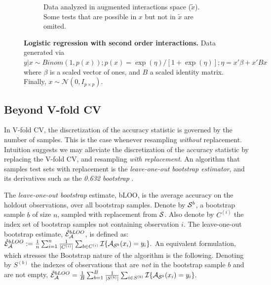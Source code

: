 \documentclass[oupdraft]{bio}
\begin{document}
\begin{figure}[th]
\begin{subfigure}[t]{.45\columnwidth}
		\caption{Data analyzed in augmented interactions space ($\tilde x$).
		Some tests that are possible in $x$ but not in $\tilde{x}$ are omited.}
		\label{fig:interactions-in-augmented-space}
	\end{subfigure}
	\caption{\textbf{Logistic regression with second order interactions.} 
		Data generated via $y|x \sim Binom(1,p(x));
		p(x)=\exp(\eta)/[1+\exp(\eta)];
		\eta=x'\beta+x'Bx$ where 
		$\beta$ is a scaled vector of ones, and $B$ a scaled identity matrix.
		Finally, $x\sim \mathcal{N}(0,I_{p\times p})$.
	 } 
	\label{fig:logistic-main-and-interactions}
\end{figure}





\subsection{Beyond V-fold CV}
\label{sec:bootstrap}

In V-fold CV, the discretization of the accuracy statistic is governed by the number of samples. 
This is the case whenever resampling \emph{without} replacement. 
Intuition suggests we may alleviate the discretization of the accuracy statistic by replacing the V-fold CV, and resampling \emph{with replacement}.
An algorithm that samples test sets with replacement is the \emph{leave-one-out bootstrap estimator},  and its derivatives such as the \emph{0.632 bootstrap} \citep[Sec 7.11]{hastie_elements_2003}.
\begin{definition}[bLOO]
	\label{def:bloo}
	The \emph{leave-one-out bootstrap} estimate, bLOO, is the average accuracy on the holdout observations, over all bootstrap samples. 
	Denote by $\mathcal{S}^b$, a bootstrap sample $b$ of size $n$, sampled with replacement from $\mathcal{S}$. 
	Also denote by $C^{(i)}$ the index set of bootstrap samples not containing observation $i$.
	The leave-one-out bootstrap estimate, $\hat{\mathcal{E}}_{\mathcal{A}}^{bLOO}$,  is defined as:
	$\hat{\mathcal{E}}_{\mathcal{A}}^{bLOO}:= \frac 1n \sum_{i=1}^{n} \frac{1}{|C^{(i)}|} \sum_{b \in C^{(i)}} \mathcal{I}{\{ \mathcal{A}_{\mathcal{S}^b}(x_i)=y_i \}}.$
	An equivalent formulation, which stresses the Bootstrap nature of the algorithm is the following. 
	Denoting by $S^{(b)}$ the indexes of observations that are \emph{not} in the bootstrap sample $b$ and are not empty, 
	$\hat{\mathcal{E}}_{\mathcal{A}}^{bLOO} = \frac 1B \sum_{b=1}^{B} \frac{1}{|S^{(b)}|} \sum_{i \in S^{(b)}} \mathcal{I}{\{ \mathcal{A}_{\mathcal{S}^b}(x_i)=y_i \}}.$
\end{definition}
\end{document}
